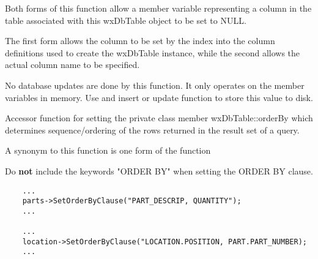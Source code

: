 Both forms of this function allow a member variable representing a column
in the table associated with this wxDbTable object to be set to NULL.

The first form allows the column to be set by the index into the column
definitions used to create the wxDbTable instance, while the second allows
the actual column name to be specified.




No database updates are done by this function.  It only operates on the
member variables in memory.  Use and insert or update function to store this
value to disk.

\label{wxdbtablesetorderbyclause}


Accessor function for setting the private class member wxDbTable::orderBy
which determines sequence/ordering of the rows returned in the result set
of a query.

A synonym to this function is one form of the function 




Do {\bf not} include the keywords "ORDER BY" when setting the ORDER BY clause.


\begin{verbatim}
    ...
    parts->SetOrderByClause("PART_DESCRIP, QUANTITY");
    ...

    ...
    location->SetOrderByClause("LOCATION.POSITION, PART.PART_NUMBER);
    ...
\end{verbatim}

